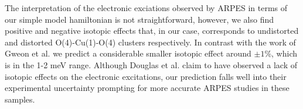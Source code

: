 The interpretation of the electronic exciations observed by ARPES in terms of our simple model hamiltonian is not straightforward, however, we also find positive and negative isotopic effects that, in our case, corresponds to undistorted and distorted O(4)-Cu(1)-O(4) clusters respectively.
In contrast with the work of Gweon et al. we predict a considerable smaller isotopic effect around $\pm 1$\%, which is in the 1-2 meV range.
Although Douglas et al. claim to have observed a lack of isotopic effects on the electronic excitations, our prediction falls well into their experimental uncertainty prompting for more accurate ARPES studies in these samples.